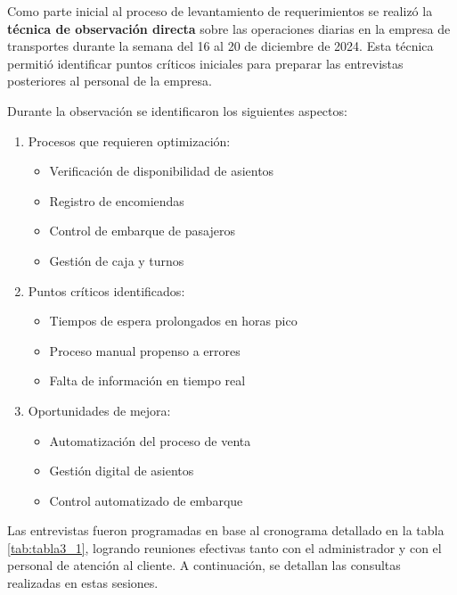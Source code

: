 	Como parte inicial al proceso de levantamiento de requerimientos se realizó la \textbf{técnica de observación directa} sobre las operaciones diarias en la empresa de transportes durante la semana del 16 al 20 de diciembre de 2024. Esta técnica permitió identificar puntos críticos iniciales para preparar las entrevistas posteriores al personal de la empresa.
	
	Durante la observación se identificaron los siguientes aspectos:
	
	\begin{enumerate}[left=0.1cm, labelsep = 0.9cm, topsep = 0pt, parsep = 0pt]
		\item Procesos que requieren optimización:
		\begin{itemize}[label=$-$, left=0cm, labelsep = 0.9cm, topsep = 0pt, parsep = 0pt]
			\item Verificación de disponibilidad de asientos
			\item Registro de encomiendas
			\item Control de embarque de pasajeros
			\item Gestión de caja y turnos
		\end{itemize}		
		\item Puntos críticos identificados:
		\begin{itemize}[label=$-$, left=0cm, labelsep = 0.9cm, topsep = 0pt, parsep = 0pt]
			\item Tiempos de espera prolongados en horas pico
			\item Proceso manual propenso a errores
			\item Falta de información en tiempo real
		\end{itemize}
		\item Oportunidades de mejora:
		\begin{itemize}[label=$-$, left=0cm, labelsep = 0.9cm, topsep = 0pt, parsep = 0pt]
			\item Automatización del proceso de venta
			\item Gestión digital de asientos
			\item Control automatizado de embarque
		\end{itemize}
	\end{enumerate}
		
	Las entrevistas fueron programadas en base al cronograma detallado en la tabla \ref{tab:tabla3_1}, logrando reuniones efectivas tanto con el administrador y con el personal de atención al cliente. A continuación, se detallan las consultas realizadas en estas sesiones.
		
